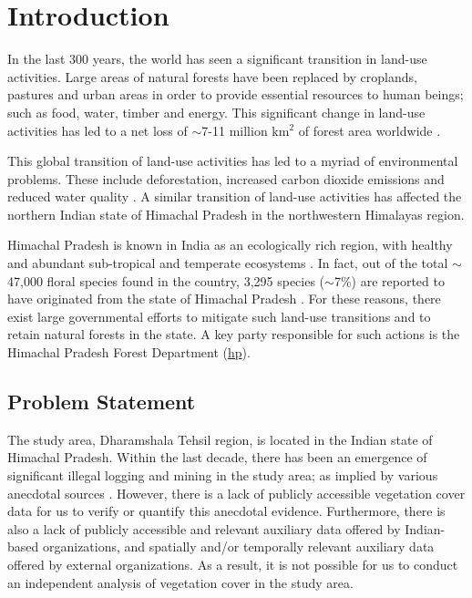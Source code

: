 \section{Introduction}

\justify
In the last 300 years, the world has seen a significant transition in land-use activities. Large areas of natural forests have been replaced by croplands, pastures and urban areas in order to provide essential resources to human beings; such as food, water, timber and energy. This significant change in land-use activities has led to a net loss of $\sim$7-11 million km$^2$ of forest area worldwide \citep{foley2005}. 

\justify
This global transition of land-use activities has led to a myriad of environmental problems. These include deforestation, increased carbon dioxide emissions and reduced water quality \citep{foley2005}. A similar transition of land-use activities has affected the northern Indian state of Himachal Pradesh in the northwestern Himalayas region. 

\justify
Himachal Pradesh is known in India as an ecologically rich region, with healthy and abundant sub-tropical and temperate ecosystems . In fact, out of the total $\sim$47,000 floral species found in the country, 3,295 species ($\sim$7\%) are reported to have originated from the state of Himachal Pradesh . For these reasons, there exist large governmental efforts to mitigate such land-use transitions and to retain natural forests in the state. A key party responsible for such actions is the Himachal Pradesh Forest Department (\href{http://www.hpforest.nic.in/}{\ac{hp}}).

\subsection{Problem Statement}

\justify
The study area, Dharamshala Tehsil region, is located in the Indian state of Himachal Pradesh. Within the last decade, there has been an emergence of significant illegal logging and mining in the study area; as implied by various anecdotal sources . However, there is a lack of publicly accessible vegetation cover data for us to verify or quantify this anecdotal evidence. Furthermore, there is also a lack of publicly accessible and relevant auxiliary data offered by Indian-based organizations, and spatially and/or temporally relevant auxiliary data offered by external organizations. As a result, it is not possible for us to conduct an independent analysis of vegetation cover in the study area.

